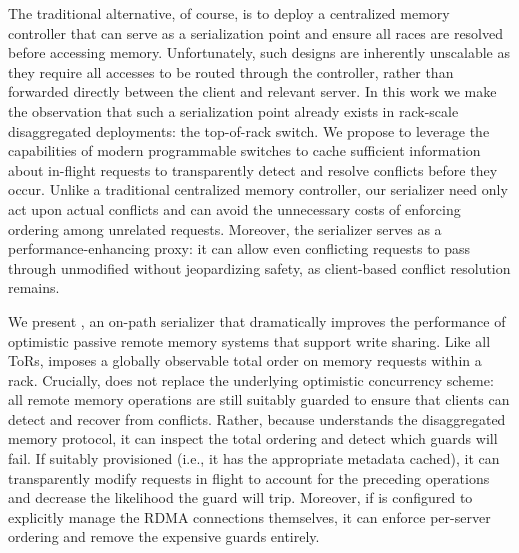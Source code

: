 
The traditional alternative, of course, is to deploy a centralized
memory controller that can serve as a serialization point and ensure
all races are resolved before accessing memory.  Unfortunately, such
designs are inherently unscalable as they require all accesses to be
routed through the controller, rather than forwarded directly between
the client and relevant server.  In this work we make the observation
that such a serialization point already exists in rack-scale
disaggregated deployments: the top-of-rack switch.  We propose to
leverage the capabilities of modern programmable switches to cache
sufficient information about in-flight requests to transparently
detect and resolve conflicts before they occur.  Unlike a traditional
centralized memory controller, our serializer need only act upon
actual conflicts and can avoid the unnecessary costs of enforcing
ordering among unrelated requests.  Moreover, the
serializer serves as a performance-enhancing proxy: it can 
allow even conflicting requests to pass through unmodified without
jeopardizing safety, as client-based conflict resolution remains.

We present {\sword}, an on-path serializer
that dramatically improves the performance of optimistic passive
remote memory systems that support write sharing.  Like all ToRs,
{\sword} imposes a globally observable total order on memory
requests within a rack.  Crucially, {\sword} does not replace the
underlying optimistic concurrency scheme: all remote memory operations
are still suitably guarded to ensure that clients can detect and
recover from conflicts.  Rather, because {\sword} understands the
disaggregated memory protocol, it can inspect the total ordering and
detect which guards will fail.  If suitably provisioned (i.e., it has
the appropriate metadata cached), it can transparently modify requests
in flight to account for the preceding operations and decrease the
likelihood the guard will trip.  Moreover, if {\sword} is configured
to explicitly manage the RDMA connections themselves, it can enforce
per-server ordering and remove the expensive guards entirely.

